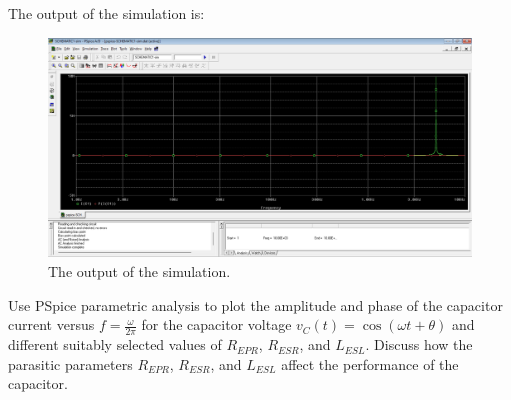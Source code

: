 \documentclass[11pt]{article}
\begin{document}
\begin{question}
\begin{subquestion}
{            The output of the simulation is:
            \begin{figure}[H]
                \centering
                \includegraphics[scale=0.35,angle=0]{Fig/Q8_1.png}
                \caption{The output of the simulation.}
            \end{figure}
        }
    \end{subquestion}

    \begin{subquestion}{Use PSpice parametric analysis to plot the amplitude and phase of the capacitor current versus $f=\frac{\omega}{2\pi}$ for the capacitor voltage $v_C(t)=\cos(\omega t+\theta)$ and different suitably selected values of $R_{EPR}$, $R_{ESR}$, and $L_{ESL}$. Discuss how the parasitic parameters $R_{EPR}$, $R_{ESR}$, and $L_{ESL}$ affect the performance of the capacitor. }
\end{subquestion}
\end{question}
\end{document}

